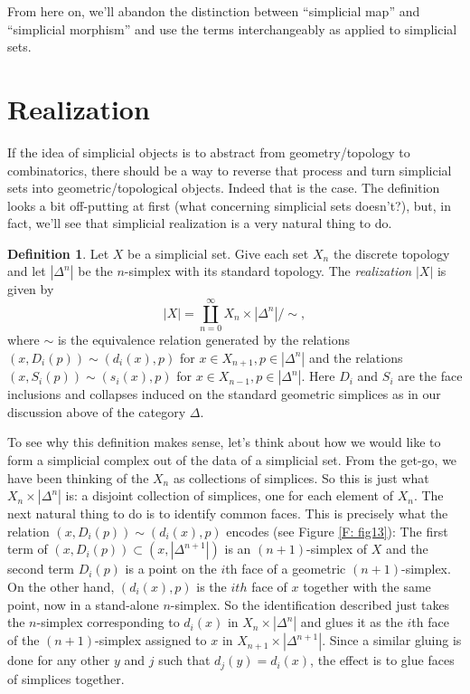 \documentclass[12pt]{article}
\theoremstyle{plain}
\theoremstyle{definition}
\newtheorem{definition}[theorem]{Definition}
\begin{document}
From here on, we'll abandon the distinction between ``simplicial map'' and ``simplicial morphism'' and use the terms interchangeably as applied to simplicial sets. 
















\section{Realization}\label{S: realization}



If the idea of simplicial objects is to abstract from geometry/topology to combinatorics, there should be a way to reverse that process and turn simplicial sets into geometric/topological objects. Indeed that is the case. The definition looks a bit off-putting at first (what concerning simplicial sets doesn't?), but, in fact, we'll see that simplicial realization is a very natural thing to do.

\begin{definition}
Let $X$ be a simplicial set. Give each set $X_n$ the discrete topology and let $|\Delta^n|$ be the $n$-simplex with its standard topology. The \emph{realization} $|X|$ is given by $$|X|=\coprod_{n=0}^\infty X_n\times |\Delta^n|/\sim,$$
where $\sim$ is the equivalence relation generated by the relations $(x,D_i(p))\sim(d_i(x),p)$ for $x\in X_{n+1}, p\in |\Delta^n|$ and the relations $(x,S_i(p))\sim(s_i(x),p)$ for $x\in X_{n-1},p\in |\Delta^n|$. Here $D_i$ and $S_i$ are the face inclusions and collapses induced on the standard geometric simplices as in our discussion above of the category $\Delta$. 
\end{definition}



To see why this definition makes sense, let's think about how we would like to form a simplicial complex out of the data of a simplicial set. From the get-go, we have been thinking of the $X_n$ as collections of simplices. So this is just what $X_n\times |\Delta^n|$ is: a disjoint collection of simplices, one for each element of $X_n$. The next natural thing to do is to identify common faces. This is precisely what the relation $(x,D_i(p))\sim(d_i(x),p)$ encodes (see Figure \ref{F: fig13}): The first term of $(x, D_i(p))\subset (x,|\Delta^{n+1}|)$ is an $(n+1)$-simplex of $X$ and the second term $D_i(p)$ is a point on the $i$th face of a geometric $(n+1)$-simplex. On the other hand, $(d_i(x),p)$ is the $ith$ face of $x$ together with the same point, now in a stand-alone $n$-simplex. So the identification described just takes the $n$-simplex corresponding to $d_i(x)$ in $X_{n}\times |\Delta^n|$ and glues it as the $i$th face of the $(n+1)$-simplex assigned to $x$ in $X_{n+1}\times |\Delta^{n+1}|$. Since a similar gluing is done for any other $y$ and $j$ such that $d_j(y)=d_i(x)$, the effect is to glue faces of simplices together. 
\end{document}

